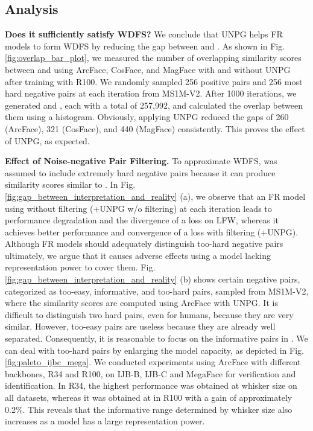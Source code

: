 \documentclass[10pt,twocolumn]{article}
\begin{document}
\subsection{Analysis}

\noindent\textbf{Does it sufficiently satisfy WDFS?} We conclude that UNPG helps FR models to form WDFS by reducing the gap between   and . As shown in Fig. \ref{fig:overlap_bar_plot}, we measured the number of overlapping similarity scores between  and  using ArcFace, CosFace, and MagFace with and without UNPG after training with R100. We randomly sampled 256 positive pairs and 256 most hard negative pairs at each iteration from MS1M-V2. After 1000 iterations, we generated  and , each with a total of 257,992, and calculated the overlap between them using a histogram. Obviously, applying UNPG reduced the gaps of 260 (ArcFace), 321 (CosFace), and 440 (MagFace) consistently. This proves the effect of UNPG, as expected. 

\noindent\textbf{Effect of Noise-negative Pair Filtering.} To approximate WDFS,  was assumed to include extremely hard negative pairs because it can produce similarity scores similar to . In Fig. \ref{fig:gap_between_interpretation_and_reality} (a), we observe that an FR model using  without filtering (+UNPG w/o filtering) at each iteration leads to performance degradation and the divergence of a loss on LFW, whereas it achieves better performance and convergence of a loss with filtering (+UNPG). Although FR models should adequately distinguish too-hard negative pairs ultimately, we argue that it causes adverse effects using a model lacking representation power to cover them. Fig. \ref{fig:gap_between_interpretation_and_reality} (b) shows certain negative pairs, categorized as too-easy, informative, and too-hard pairs, sampled from MS1M-V2, where the similarity scores are computed using ArcFace with UNPG. It is difficult to distinguish two hard pairs, even for humans, because they are very similar. However, too-easy pairs are useless because they are already well separated. Consequently, it is reasonable to focus on the informative pairs in . We can deal with too-hard pairs by enlarging the model capacity, as depicted in Fig. \ref{fig:paleto_ijbc_mega}. We conducted experiments using ArcFace with different backbones, R34 and R100, on IJB-B, IJB-C and MegaFace for verification and identification. In R34, the highest performance was obtained at whisker size  on all datasets, whereas it was obtained at  in R100 with a gain of approximately 0.2\%. This reveals that the informative range determined by whisker size  also increases as a model has a large representation power. 
\end{document}
